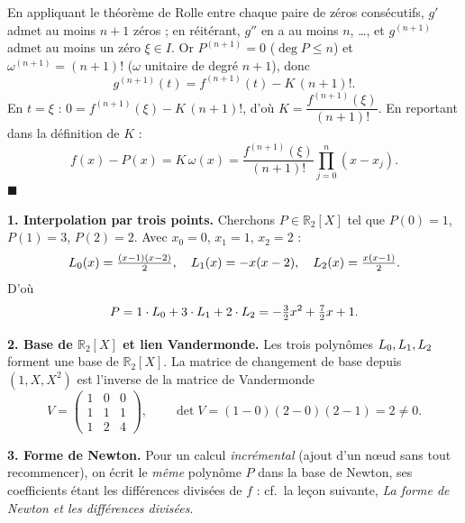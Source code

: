 \begin{mdframed}[style=proofbar]
  En appliquant le théorème de Rolle entre chaque paire de zéros
  consécutifs, $g'$ admet au moins $n+1$ zéros ; en réitérant, $g''$ en a
  au moins $n$, \ldots, et $g^{(n+1)}$ admet au moins un zéro $\xi \in I$.
  Or $P^{(n+1)} = 0$ ($\deg P \leq n$) et $\omega^{(n+1)} = (n+1)!$
  ($\omega$ unitaire de degré $n+1$), donc
  \[
    g^{(n+1)}(t) = f^{(n+1)}(t) - K\,(n+1)!.
  \]
  En $t=\xi$ : $0 = f^{(n+1)}(\xi) - K\,(n+1)!$, d'où
  $K = \dfrac{f^{(n+1)}(\xi)}{(n+1)!}$. En reportant dans la définition de
  $K$ :
  \[
    f(x) - P(x) = K\,\omega(x)
    = \frac{f^{(n+1)}(\xi)}{(n+1)!} \prod_{j=0}^{n}(x-x_j).
  \]
  \hfill$\blacksquare$
\end{mdframed}

\decsep{}



\begin{mdframed}[style=exbar]
  \textbf{1. Interpolation par trois points.}\enspace
  Cherchons $P \in \mathbb{R}_2[X]$ tel que $P(0)=1$, $P(1)=3$, $P(2)=2$.
  Avec $x_0=0$, $x_1=1$, $x_2=2$ :
  \[
    L_{0}(x)=\tfrac{(x-1)(x-2)}{2},\quad
    L_{1}(x)=-x(x-2),\quad
    L_{2}(x)=\tfrac{x(x-1)}{2}.
  \]
  D'où
  \[
    P = 1\cdot L_{0} + 3\cdot L_{1} + 2\cdot L_{2}
      = -\tfrac{3}{2}x^2 + \tfrac{7}{2}x + 1.
  \]

  \smallskip\noindent
  \textbf{2. Base de $\mathbb{R}_2[X]$ et lien Vandermonde.}\enspace
  Les trois polynômes $L_{0},L_{1},L_{2}$ forment une base de
  $\mathbb{R}_2[X]$. La matrice de changement de base depuis
  $(1,X,X^2)$ est l'inverse de la matrice de Vandermonde
  \[
    V = \begin{pmatrix} 1 & 0 & 0 \\ 1 & 1 & 1 \\ 1 & 2 & 4 \end{pmatrix},
    \qquad \det V = (1-0)(2-0)(2-1) = 2 \neq 0.
  \]

  \smallskip\noindent
  \textbf{3. Forme de Newton.}\enspace%
  Pour un calcul \emph{incrémental} (ajout d'un nœud sans tout recommencer),
  on écrit le \emph{même} polynôme $P$ dans la base de Newton, ses
  coefficients étant les différences divisées de $f$ : cf.\ la leçon
  suivante, \emph{La forme de Newton et les différences divisées}.
\end{mdframed}

